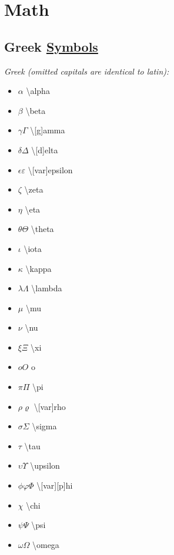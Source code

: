 \section{Math}


\subsection*{Greek \href{https://en.wikipedia.org/wiki/List_of_mathematical_symbols_by_subject\#Vector_calculus}{Symbols}}
\textit{Greek (omitted capitals are identical to latin):} \\
\begin{minipage}{3cm}
\begin{itemize}[label={}]
    \item  $\alpha$ \textbackslash alpha
    \item $\beta$ \textbackslash beta 
    \item $\gamma\Gamma$ \textbackslash [g]amma 
    \item $\delta\Delta$ \textbackslash [d]elta 
    \item $\epsilon\varepsilon$ \textbackslash [var]epsilon 
    \item $\zeta$ \textbackslash zeta 
    \item $\eta$ \textbackslash eta
    \item $\theta\Theta$ \textbackslash theta 
    \item $\iota$ \textbackslash iota 
    \item $\kappa$ \textbackslash kappa 
    \item $\lambda\Lambda$ \textbackslash lambda 
    \item $\mu$ \textbackslash mu 
\end{itemize} 
\end{minipage}
\begin{minipage}{3cm}
\begin{itemize}[label={}]
    \item $\nu$ \textbackslash nu 
    \item $\xi\Xi$ \textbackslash xi 
    \item $oO$ o 
    \item $\pi\Pi$ \textbackslash pi 
    \item $\rho\varrho$ \textbackslash [var]rho 
    \item $\sigma\Sigma$ \textbackslash sigma 
    \item $\tau$ \textbackslash tau 
    \item $\upsilon\Upsilon$ \textbackslash upsilon 
    \item $\phi\varphi\Phi$ \textbackslash [var][p]hi 
    \item $\chi$ \textbackslash chi 
    \item $\psi\Psi$ \textbackslash psi 
    \item $\omega\Omega$ \textbackslash omega 
\end{itemize} 
\end{minipage} \\


